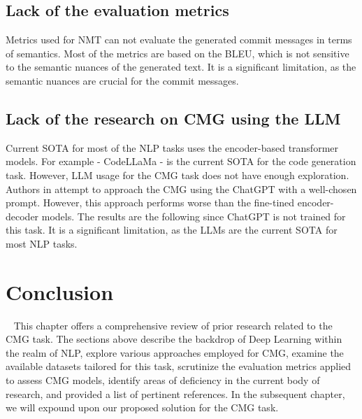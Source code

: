 \subsection{Lack of the evaluation metrics}
Metrics used for NMT can not evaluate the generated commit messages in terms of semantics. Most of the metrics are based on the BLEU, which is not sensitive to the semantic nuances of the generated text. It is a significant limitation, as the semantic nuances are crucial for the commit messages.

\subsection{Lack of the research on CMG using the LLM}
Current SOTA for most of the NLP tasks uses the encoder-based transformer models. For example {-} CodeLLaMa{ }\cite{roziere2023code} {-} is the current SOTA for the code generation task. However, LLM usage for the CMG task does not have enough exploration. Authors in{ }\cite{eliseeva2023commit} attempt to approach the CMG using the ChatGPT with a well-chosen prompt. However, this approach performs worse than the fine-tined encoder-decoder models. The results are the following since  ChatGPT is not trained for this task. It is a significant limitation, as the LLMs are the current SOTA for most NLP tasks.

\section{Conclusion}~\label{sec:lr_conclusion}
This chapter offers a comprehensive review of prior research related to the CMG task. The sections above describe the backdrop of Deep Learning within the realm of NLP, explore various approaches employed for CMG, examine the available datasets tailored for this task, scrutinize the evaluation metrics applied to assess CMG models, identify areas of deficiency in the current body of research, and provided a list of pertinent references. In the subsequent chapter, we will expound upon our proposed solution for the CMG task.
